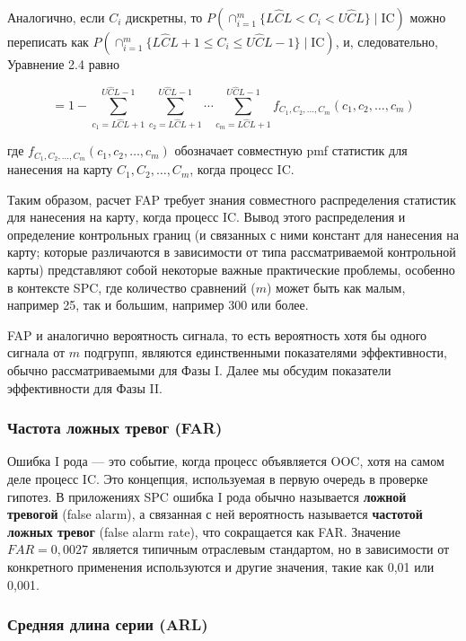 Аналогично, если \(C_i\) дискретны, то \(P(\cap_{i=1}^m \{L\hat{C}L < C_i < U\hat{C}L\} \mid \text{IC})\) можно переписать как \(P(\cap_{i=1}^m \{L\hat{C}L + 1 \leq C_i \leq U\hat{C}L - 1\} \mid \text{IC})\), и, следовательно, Уравнение 2.4 равно

\[
= 1 - \sum_{c_1=L\hat{C}L+1}^{U\hat{C}L-1} \sum_{c_2=L\hat{C}L+1}^{U\hat{C}L-1} \cdots \sum_{c_m=L\hat{C}L+1}^{U\hat{C}L-1} f_{C_1, C_2, \ldots, C_m}(c_1, c_2, \ldots, c_m)
\]

где \(f_{C_1, C_2, \ldots, C_m}(c_1, c_2, \ldots, c_m)\) обозначает совместную pmf статистик для нанесения на карту \(C_1, C_2, \ldots, C_m\), когда процесс IC.

Таким образом, расчет FAP требует знания совместного распределения статистик для нанесения на карту, когда процесс IC. Вывод этого распределения и определение контрольных границ (и связанных с ними констант для нанесения на карту; которые различаются в зависимости от типа рассматриваемой контрольной карты) представляют собой некоторые важные практические проблемы, особенно в контексте SPC, где количество сравнений (\(m\)) может быть как малым, например 25, так и большим, например 300 или более.

FAP и аналогично вероятность сигнала, то есть вероятность хотя бы одного сигнала от \(m\) подгрупп, являются единственными показателями эффективности, обычно рассматриваемыми для Фазы I. Далее мы обсудим показатели эффективности для Фазы II.

\subsubsection{Частота ложных тревог (FAR)}

Ошибка I рода — это событие, когда процесс объявляется OOC, хотя на самом деле процесс IC. Это концепция, используемая в первую очередь в проверке гипотез. В приложениях SPC ошибка I рода обычно называется \textbf{ложной тревогой} (false
alarm), а связанная с ней вероятность называется \textbf{частотой ложных тревог} (false alarm
rate), что сокращается как FAR. Значение \(FAR = 0,0027\) является типичным отраслевым стандартом, но в зависимости от конкретного применения используются и другие значения, такие как 0,01 или 0,001.

\subsubsection{Средняя длина серии (ARL)}

